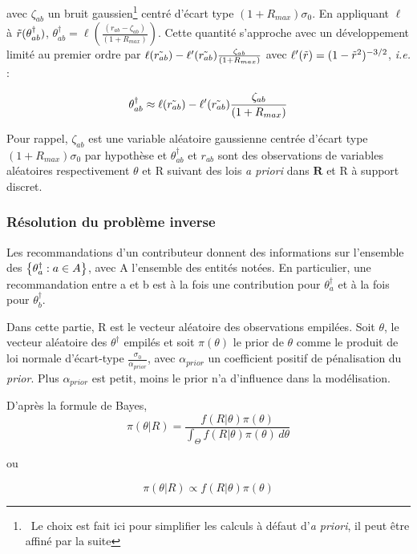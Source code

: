 avec $\zeta_{ab}$ un bruit gaussien\footnote{~Le choix est fait ici pour simplifier les calculs à défaut d'\textit{a priori}, il peut être affiné par la suite} centré d'écart type $(1+R_{max})\sigma_0$.
En appliquant $\ell$ à $\Tilde{r}(\theta_{ab}^\dagger)$, $\theta_{ab}^\dagger = \ell (\frac{( r_{ab}-\zeta_{ab})}{(1+R_{max})})$.
Cette quantité s'approche avec un développement limité au premier ordre par $\ell(\Tilde{r_{ab}}) - \ell'(\Tilde{r_{ab}})\frac{\zeta_{ab}}{(1+R_{max})}$ avec $\ell'(\Tilde{r})=(1-\Tilde{r}^2)^{-3/2}$,  \textit{i.e.} :

\begin{equation}
    \theta_{ab}^\dagger \approx \ell(\Tilde{r_{ab}}) - \ell'(\Tilde{r_{ab}})\frac{\zeta_{ab}}{(1+R_{max})}
\end{equation}

Pour rappel, $\zeta_{ab}$ est une variable aléatoire gaussienne centrée d'écart type $(1+R_{max})\sigma_0$  par hypothèse
et $\theta_{ab}^\dagger$ et $r_{ab}$ sont des observations de variables aléatoires respectivement $\theta$ et R suivant des lois \textit{a priori} dans $\mathbf{R}$ et R à support discret.

\subsubsection{Résolution du problème inverse}

Les recommandations d'un contributeur donnent des informations sur l'ensemble des $\left\lbrace \theta^\dagger_a : a \in A \right\rbrace$, avec A l'ensemble des entités notées.
En particulier, une recommandation entre a et b est à la fois une contribution pour $\theta^\dagger_a$ et à la fois pour $\theta^\dagger_b$.

Dans cette partie, R est le vecteur aléatoire des observations empilées.
Soit $\theta$, le vecteur aléatoire des $\theta^\dagger$ empilés
et soit $\pi(\theta)$ le prior de $\theta$ comme le produit de loi normale d'écart-type $\frac{\sigma_0}{\alpha_{prior}}$, avec $\alpha_{prior}$ un coefficient positif de pénalisation du \textit{prior}. Plus $\alpha_{prior}$ est petit, moins le prior n'a d'influence dans la modélisation.

D'après la formule de Bayes,
\begin{equation}
\pi(\theta|R) = \frac{f(R|\theta)\pi(\theta)}
{\int_{\Theta} f(R|\theta)\pi(\theta) \,d\theta }
\end{equation}

ou  

\begin{equation}
\pi(\theta|R) \propto f(R|\theta)\pi(\theta)
\end{equation}


